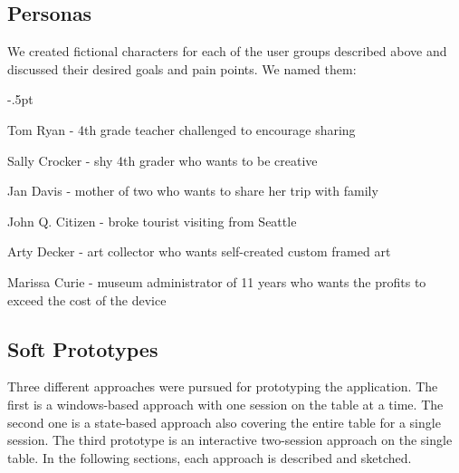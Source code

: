 \documentclass{tei2013}
\begin{document}
\subsection{Personas}
We created fictional characters for each of the user groups described above and discussed their desired goals and pain points.  We named them:
\begin{description}\itemsep-.5pt
\item[Teacher]{Tom Ryan - 4th grade teacher challenged to encourage sharing}
\item[Student]{Sally Crocker - shy 4th grader who wants to be creative}
\item[Parent]{Jan Davis - mother of two who wants to share her trip with family}
\item[General Public]{John Q. Citizen - broke tourist visiting from Seattle}
\item[Enthusiast]{Arty Decker - art collector who wants self-created custom framed art}
\item[Museum Administrator]{Marissa Curie - museum administrator of 11 years who wants the profits to exceed the cost of the device}
\end{description}


\subsection{Soft Prototypes}
Three different approaches were pursued for prototyping the application.  The first is a windows-based approach with one session on the table at a time.  The second one is a state-based approach also covering the entire table for a single session.  The third prototype is an interactive two-session approach on the single table.  In the following sections, each approach is described and sketched.

\end{document}
